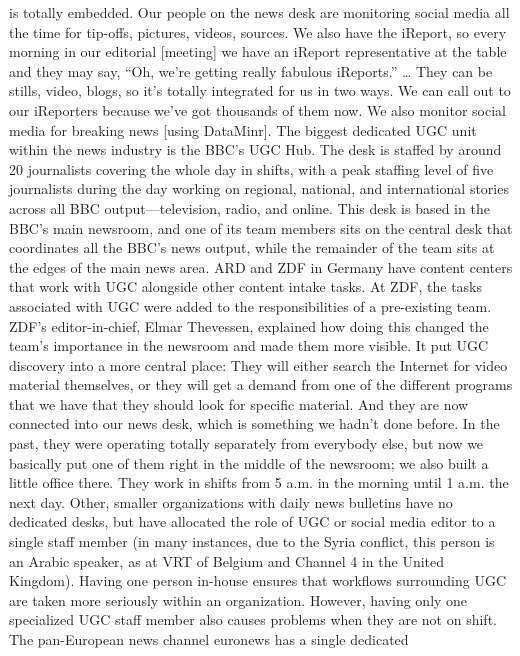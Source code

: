 \begin{enumerate}
 is totally embedded. Our people on the
news desk are monitoring social media all the time for tip-offs, pictures,
videos, sources. We also have the iReport, so every morning
in our editorial [meeting] we have an iReport representative at the
table and they may say, ``Oh, we're getting really fabulous iReports.''
… They can be stills, video, blogs, so it's totally integrated for us in
two ways. We can call out to our iReporters because we've got thousands
of them now. We also monitor social media for breaking news
[using DataMinr].
The biggest dedicated UGC unit within the news industry is the BBC's UGC
Hub. The desk is staffed by around 20 journalists covering the whole day in
shifts, with a peak staffing level of five journalists during the day working on
regional, national, and international stories across all BBC output—television,
radio, and online. This desk is based in the BBC's main newsroom, and
one of its team members sits on the central desk that coordinates all the
BBC's news output, while the remainder of the team sits at the edges of the
main news area.
ARD and ZDF in Germany have content centers that work with UGC alongside
other content intake tasks. At ZDF, the tasks associated with UGC were
added to the responsibilities of a pre-existing team. ZDF's editor-in-chief,
Elmar Thevessen, explained how doing this changed the team's importance
in the newsroom and made them more visible. It put UGC discovery into a
more central place:
They will either search the Internet for video material themselves, or
they will get a demand from one of the different programs that we
have that they should look for specific material. And they are now
connected into our news desk, which is something we hadn't done
before. In the past, they were operating totally separately from everybody else, but now we basically put one of them right in the middle
of the newsroom; we also built a little office there. They work in shifts
from 5 a.m. in the morning until 1 a.m. the next day.
Other, smaller organizations with daily news bulletins have no dedicated
desks, but have allocated the role of UGC or social media editor to a single
staff member (in many instances, due to the Syria conflict, this person is an
Arabic speaker, as at VRT of Belgium and Channel 4 in the United Kingdom).
Having one person in-house ensures that workflows surrounding UGC are
taken more seriously within an organization. However, having only one
specialized UGC staff member also causes problems when they are not
on shift. The pan-European news channel euronews has a single dedicated

\end{enumerate}
